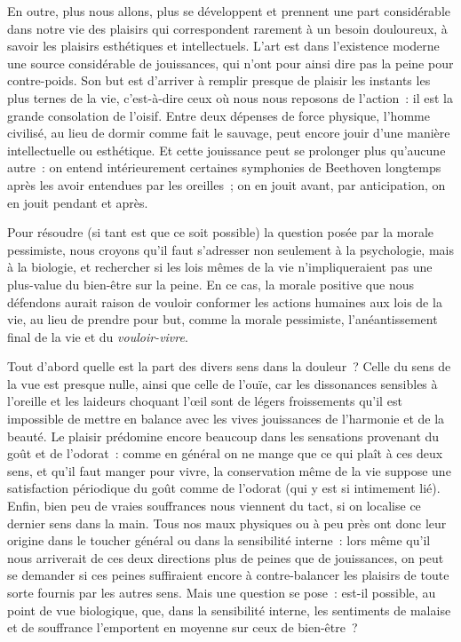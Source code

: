 \documentclass[french,twoside]{book} %
\begin{document}
En outre, plus nous allons, plus se développent et prennent une part considérable dans notre vie des plaisirs qui correspondent rarement à un besoin douloureux, à savoir les plaisirs esthétiques et intellectuels. L’art est dans l’existence moderne une source considérable de jouissances, qui n’ont pour ainsi dire pas la peine pour contre-poids. Son but est d’arriver à remplir presque de plaisir les instants les plus ternes de la vie, c’est-à-dire ceux où nous nous reposons de l’action : il est la grande consolation de l’oisif. Entre deux dépenses de force physique, l’homme civilisé, au lieu de dormir comme fait le sauvage, peut encore jouir d’une manière intellectuelle ou esthétique. Et cette jouissance peut se prolonger plus qu’aucune autre : on entend intérieurement certaines symphonies de Beethoven longtemps après les avoir entendues par les oreilles ; on en jouit avant, par anticipation, on en jouit pendant et après.\par
Pour résoudre (si tant est que ce soit possible) la question posée par la morale pessimiste, nous croyons qu’il faut s’adresser non seulement à la psychologie, mais à la biologie, et rechercher si les lois mêmes de la vie n’impliqueraient pas une plus-value du bien-être sur la peine. En ce cas, la morale positive que nous défendons aurait raison de vouloir conformer les actions humaines aux lois de la vie, au lieu de prendre pour but, comme la morale pessimiste, l’anéantissement final de la vie et du \emph{vouloir-vivre}.\par
Tout d’abord quelle est la part des divers sens dans la douleur ? Celle du sens de la vue est presque nulle, ainsi que celle de l’ouïe, car les dissonances sensibles à l’oreille et les laideurs choquant l’œil sont de légers froissements qu’il est impossible de mettre en balance avec les vives jouissances de l’harmonie et de la beauté. Le plaisir prédomine encore beaucoup dans les sensations provenant du goût et de l’odorat : comme en général on ne mange que ce qui plaît à ces deux sens, et qu’il faut manger pour vivre, la conservation même de la vie suppose une satisfaction périodique du goût comme de l’odorat (qui y est si intimement lié). Enfin, bien peu de vraies souffrances nous viennent du tact, si on localise ce dernier sens dans la main. Tous nos maux physiques ou à peu près ont donc leur origine dans le toucher général ou dans la sensibilité interne : lors même qu’il nous arriverait de ces deux directions plus de peines que de jouissances, on peut se demander si ces peines suffiraient encore à contre-balancer les plaisirs de toute sorte fournis par les autres sens. Mais une question se pose : est-il possible, au point de vue biologique, que, dans la sensibilité interne, les sentiments de malaise et de souffrance l’emportent en moyenne sur ceux de bien-être ?\par
\end{document}

